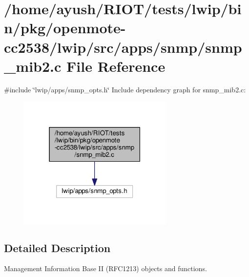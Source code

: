 \hypertarget{openmote-cc2538_2lwip_2src_2apps_2snmp_2snmp__mib2_8c}{}\section{/home/ayush/\+R\+I\+O\+T/tests/lwip/bin/pkg/openmote-\/cc2538/lwip/src/apps/snmp/snmp\+\_\+mib2.c File Reference}
\label{openmote-cc2538_2lwip_2src_2apps_2snmp_2snmp__mib2_8c}
{\ttfamily \#include \char`\"{}lwip/apps/snmp\+\_\+opts.\+h\char`\"{}}\newline
Include dependency graph for snmp\+\_\+mib2.\+c\+:
\nopagebreak
\begin{figure}[H]
\begin{center}
\leavevmode
\includegraphics[width=219pt]{openmote-cc2538_2lwip_2src_2apps_2snmp_2snmp__mib2_8c__incl}
\end{center}
\end{figure}


\subsection{Detailed Description}
Management Information Base II (R\+F\+C1213) objects and functions. 
